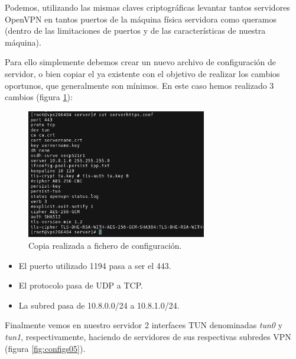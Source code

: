 \documentclass[a4paper, 11pt, titlepage]{article}
\begin{document}
        Podemos, utilizando las mismas claves criptográficas levantar tantos servidores OpenVPN en tantos
        puertos de la máquina física servidora como queramos (dentro de las limitaciones de puertos y de las
        características de nuestra máquina).

        Para ello simplemente debemos crear un nuevo archivo de configuración de servidor, o bien
        copiar el ya existente con el objetivo de realizar los cambios oportunos, que generalmente 
        son mínimos. En este caso hemos realizado 3 cambios (figura \ref{fig:configs04}):

        \begin{figure}[htp]
            \centering
            \includegraphics[width=0.7\textwidth]{resources/configs04.png}
            \caption{Copia realizada a fichero de configuración.}
            \label{fig:configs04}
        \end{figure} 

        \begin{itemize}
            \item El puerto utilizado 1194 pasa a ser el 443.
            \item El protocolo pasa de UDP a TCP.
            \item La subred pasa de 10.8.0.0/24 a 10.8.1.0/24.
        \end{itemize}

        Finalmente vemos en nuestro servidor 2 interfaces TUN denominadas \textit{tun0} y \textit{tun1},
        respectivamente, haciendo de servidores de sus respectivas subredes VPN (figura \ref{fig:configs05}).
\end{document}
